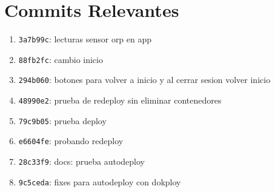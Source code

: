 \documentclass[11pt, a4paper]{article}
\begin{document}
\section{Commits Relevantes}
\begin{enumerate}
  \item \texttt{3a7b99c}: lecturas sensor orp en app
  \item \texttt{88fb2fc}: cambio inicio
  \item \texttt{294b060}: botones para volver a inicio y al cerrar sesion volver inicio
  \item \texttt{48990e2}: prueba de redeploy sin eliminar contenedores
  \item \texttt{79c9b05}: prueba deploy
  \item \texttt{e6604fe}: probando redeploy
  \item \texttt{28c33f9}: docs: prueba autodeploy
  \item \texttt{9c5ceda}: fixes para autodeploy con dokploy
\end{enumerate}
\end{document}
